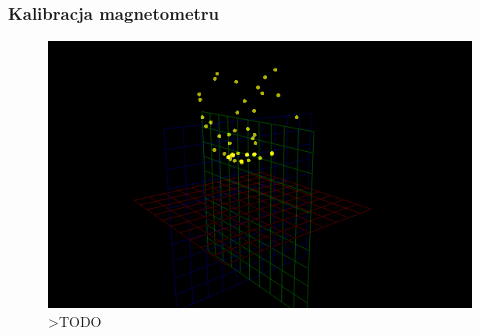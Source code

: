 \subsubsection{Kalibracja magnetometru}
\label{sec:mag_cal}




\begin{figure}[ht]
	\centering
		\includegraphics[width=0.8\linewidth]{rys/ScanBot-03-magnetometer-3d-decalibrated.PNG}
	\caption{>TODO}
	\label{fig:xxx}
\end{figure}





